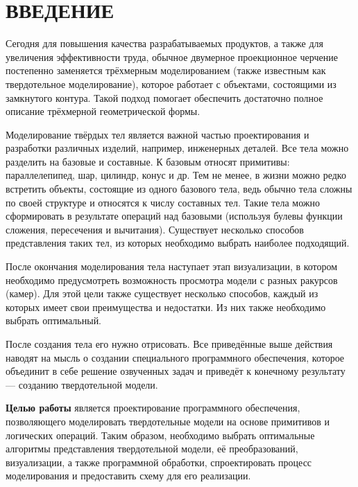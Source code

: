 \section*{ВВЕДЕНИЕ}

Сегодня для повышения качества разрабатываемых продуктов, а также для увеличения эффективности труда, обычное двумерное проекционное черчение постепенно заменяется трёхмерным моделированием (также известным как твердотельное моделирование), которое работает с объектами, состоящими из замкнутого контура. 
Такой подход помогает обеспечить достаточно полное описание трёхмерной геометрической формы.

Моделирование твёрдых тел является важной частью проектирования и разработки различных изделий, например, инженерных деталей. 
Все тела можно разделить на базовые и составные. 
К базовым относят примитивы: параллелепипед, шар, цилиндр, конус и др. 
Тем не менее, в жизни можно редко встретить объекты, состоящие из одного базового тела, ведь обычно тела сложны по своей структуре и относятся к числу составных тел. 
Такие тела можно сформировать в результате операций над базовыми (используя булевы функции сложения, пересечения и вычитания). 
Существует несколько способов представления таких тел, из которых необходимо выбрать наиболее подходящий.

После окончания моделирования тела наступает этап визуализации, в котором необходимо предусмотреть возможность просмотра модели с разных ракурсов (камер). 
Для этой цели также существует несколько способов, каждый из которых имеет свои преимущества и недостатки. 
Из них также необходимо выбрать оптимальный.

После создания тела его нужно отрисовать. 
Все приведённые выше действия наводят на мысль о создании специального программного обеспечения, которое объединит в себе решение озвученных задач и приведёт к конечному результату --- созданию твердотельной модели.

\textbf{Целью работы} является проектирование программного обеспечения, позволяющего моделировать твердотельные модели на основе примитивов и логических операций. 
Таким образом, необходимо выбрать оптимальные алгоритмы представления твердотельной модели, её преобразований, визуализации, а также программной обработки, спроектировать процесс моделирования и предоставить схему для его реализации. 
\pagebreak